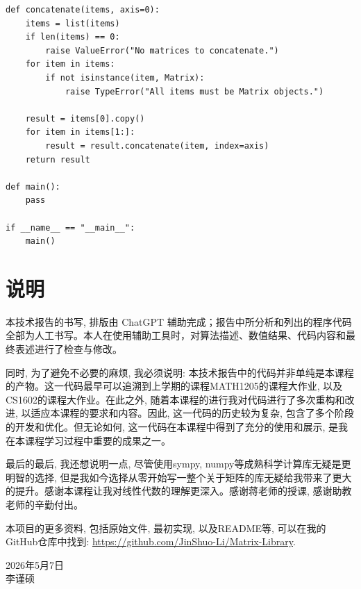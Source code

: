 \documentclass[UTF8,zihao=-4]{ctexart}
\begin{document}
\begin{lstlisting}[style=pycodestyle,caption={matlibrary.py 完整源码}]
def concatenate(items, axis=0):
	items = list(items)
	if len(items) == 0:
		raise ValueError("No matrices to concatenate.")
	for item in items:
		if not isinstance(item, Matrix):
			raise TypeError("All items must be Matrix objects.")

	result = items[0].copy()
	for item in items[1:]:
		result = result.concatenate(item, index=axis)
	return result

def main():
    pass

if __name__ == "__main__":
    main()
\end{lstlisting}

\section*{说明}

本技术报告的书写, 排版由 ChatGPT 辅助完成；报告中所分析和列出的程序代码全部为人工书写。本人在使用辅助工具时，对算法描述、数值结果、代码内容和最终表述进行了检查与修改。

同时, 为了避免不必要的麻烦, 我必须说明: 本技术报告中的代码并非单纯是本课程的产物。这一代码最早可以追溯到上学期的课程MATH1205的课程大作业, 以及CS1602的课程大作业。在此之外, 随着本课程的进行我对代码进行了多次重构和改进, 以适应本课程的要求和内容。因此, 这一代码的历史较为复杂, 包含了多个阶段的开发和优化。但无论如何, 这一代码在本课程中得到了充分的使用和展示, 是我在本课程学习过程中重要的成果之一。

最后的最后, 我还想说明一点, 尽管使用sympy, numpy等成熟科学计算库无疑是更明智的选择, 但是我如今选择从零开始写一整个关于矩阵的库无疑给我带来了更大的提升。感谢本课程让我对线性代数的理解更深入。感谢蒋老师的授课, 感谢助教老师的辛勤付出。

本项目的更多资料, 包括原始文件, 最初实现, 以及README等, 可以在我的GitHub仓库中找到: \url{https://github.com/JinShuo-Li/Matrix-Library}.

\begin{flushright}
    2026年5月7日 \\
    李谨硕 \\
\end{flushright}
\end{document}
